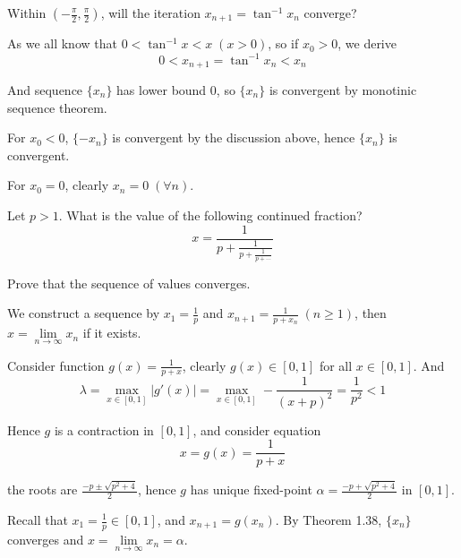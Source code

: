 \documentclass[11pt]{elegantbook}
\begin{document}
\vspace{1.5em}

\begin{problem}
  Within $\left(-\frac{\pi}{2},\frac{\pi}{2}\right)$, will the iteration $x_{n+1}=\tan^{-1} x_n$ converge?
\end{problem}
\begin{solution}
  As we all know that $0<\tan^{-1} x < x \;(x>0)$, so if $x_0>0$, we derive
  \begin{equation*}
    0<x_{n+1}=\tan^{-1} x_n < x_n
  \end{equation*}

  And sequence $\{x_n\}$ has lower bound $0$, so $\{x_n\}$ is convergent by monotinic sequence theorem.

  For $x_0<0$, $\{-x_n\}$ is convergent by the discussion above, hence $\{x_n\}$ is convergent.

  For $x_0=0$, clearly $x_n=0\;(\forall n)$.
\end{solution}

\vspace{1.5em}

\begin{problem}
  Let $p>1$. What is the value of the following continued fraction?
  \begin{equation*}
    x=\frac{1}{p+\frac{1}{p+\frac{1}{p+\cdots}}}
  \end{equation*}

  Prove that the sequence of values converges.
\end{problem}

\begin{solution}
  We construct a sequence by $x_1=\frac{1}{p}$ and $x_{n+1}=\frac{1}{p+x_n}\;(n\geq 1)$, then $x=\lim\limits_{n\to\infty} x_n$ if it exists.

  Consider function $g(x)=\frac{1}{p+x}$, clearly $g(x)\in[0,1]$ for all $x\in[0,1]$. And
  \begin{equation*}
    \lambda = \max_{x\in[0,1]} |g'(x)| = \max_{x\in[0,1]} -\frac{1}{(x+p)^2} = \frac{1}{p^2} < 1
  \end{equation*}

  Hence $g$ is a contraction in $[0,1]$, and consider equation
  \begin{equation*}
    x=g(x)=\frac{1}{p+x}
  \end{equation*}

  the roots are $\frac{-p\pm\sqrt{p^2+4}}{2}$, hence $g$ has unique fixed-point $\alpha=\frac{-p+\sqrt{p^2+4}}{2}$ in $[0,1]$.

  Recall that $x_1=\frac{1}{p}\in[0,1]$, and $x_{n+1}=g(x_n)$. By Theorem 1.38, $\{x_n\}$ converges and $x=\lim\limits_{n\to\infty} x_n=\alpha$. 
\end{solution}
\end{document}
